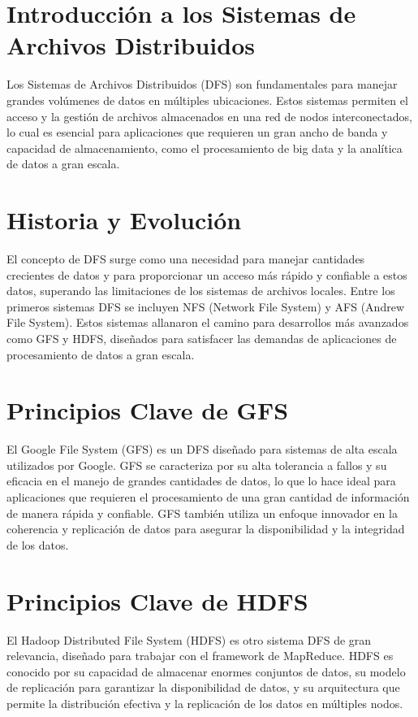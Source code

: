 \section{Introducción a los Sistemas de Archivos Distribuidos}

Los Sistemas de Archivos Distribuidos (DFS) son fundamentales para manejar grandes volúmenes de datos en múltiples ubicaciones. Estos sistemas permiten el acceso y la gestión de archivos almacenados en una red de nodos interconectados, lo cual es esencial para aplicaciones que requieren un gran ancho de banda y capacidad de almacenamiento, como el procesamiento de big data y la analítica de datos a gran escala.

\section{Historia y Evolución}

El concepto de DFS surge como una necesidad para manejar cantidades crecientes de datos y para proporcionar un acceso más rápido y confiable a estos datos, superando las limitaciones de los sistemas de archivos locales. Entre los primeros sistemas DFS se incluyen NFS (Network File System) y AFS (Andrew File System). Estos sistemas allanaron el camino para desarrollos más avanzados como GFS y HDFS, diseñados para satisfacer las demandas de aplicaciones de procesamiento de datos a gran escala.

\section{Principios Clave de GFS}

El Google File System (GFS) es un DFS diseñado para sistemas de alta escala utilizados por Google. GFS se caracteriza por su alta tolerancia a fallos y su eficacia en el manejo de grandes cantidades de datos, lo que lo hace ideal para aplicaciones que requieren el procesamiento de una gran cantidad de información de manera rápida y confiable. GFS también utiliza un enfoque innovador en la coherencia y replicación de datos para asegurar la disponibilidad y la integridad de los datos.

\section{Principios Clave de HDFS}

El Hadoop Distributed File System (HDFS) es otro sistema DFS de gran relevancia, diseñado para trabajar con el framework de MapReduce. HDFS es conocido por su capacidad de almacenar enormes conjuntos de datos, su modelo de replicación para garantizar la disponibilidad de datos, y su arquitectura que permite la distribución efectiva y la replicación de los datos en múltiples nodos.

